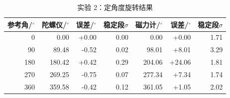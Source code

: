 \begin{table}[H]
\centering
\begin{tabular}{rrrrrrr}
\toprule
参考角/$^\circ$ & 陀螺仪/$^\circ$ & 误差/$^\circ$ & 稳定段$\sigma$ & 磁力计/$^\circ$ & 误差/$^\circ$ & 稳定段$\sigma$ \\
\midrule
0 & 0.00 & +0.00 & 0.00 & 0.00 & +0.00 & 1.71 \\
90 & 89.48 & -0.52 & 0.02 & 98.01 & +8.01 & 3.29 \\
180 & 180.42 & +0.42 & 0.29 & 204.06 & +24.06 & 1.81 \\
270 & 269.25 & -0.75 & 0.07 & 277.34 & +7.34 & 1.74 \\
360 & 359.58 & -0.42 & 0.12 & 361.05 & +1.05 & 2.02 \\
\bottomrule
\end{tabular}
\caption{实验 2：定角度旋转结果}
\label{tab:exp2}
\end{table}
